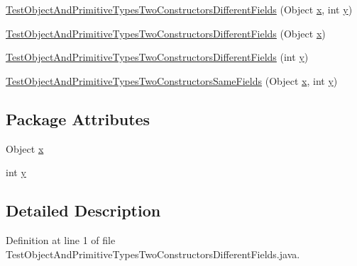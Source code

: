 \begin{DoxyCompactItemize}
\item 
\hyperlink{classTestObjectAndPrimitiveTypesTwoConstructorsDifferentFields_a9a6421d326f71132f1d7c49c3707a3df}{TestObjectAndPrimitiveTypesTwoConstructorsDifferentFields} (Object \hyperlink{classTestObjectAndPrimitiveTypesTwoConstructorsDifferentFields_acd6e4372ac5a3f095fe827a7649f4e01}{x}, int \hyperlink{classTestObjectAndPrimitiveTypesTwoConstructorsDifferentFields_a78a43959fdccd99feddcc7042de33188}{y})
\item 
\hyperlink{classTestObjectAndPrimitiveTypesTwoConstructorsDifferentFields_a1700da7274a7df883f35c35f048a87dc}{TestObjectAndPrimitiveTypesTwoConstructorsDifferentFields} (Object \hyperlink{classTestObjectAndPrimitiveTypesTwoConstructorsDifferentFields_acd6e4372ac5a3f095fe827a7649f4e01}{x})
\item 
\hyperlink{classTestObjectAndPrimitiveTypesTwoConstructorsDifferentFields_ad67d6484799aed0100b04acafd89fbb4}{TestObjectAndPrimitiveTypesTwoConstructorsDifferentFields} (int \hyperlink{classTestObjectAndPrimitiveTypesTwoConstructorsDifferentFields_a78a43959fdccd99feddcc7042de33188}{y})
\item 
\hyperlink{classTestObjectAndPrimitiveTypesTwoConstructorsDifferentFields_a3806c3ff463cc032abd2c9c7848111e2}{TestObjectAndPrimitiveTypesTwoConstructorsSameFields} (Object \hyperlink{classTestObjectAndPrimitiveTypesTwoConstructorsDifferentFields_acd6e4372ac5a3f095fe827a7649f4e01}{x}, int \hyperlink{classTestObjectAndPrimitiveTypesTwoConstructorsDifferentFields_a78a43959fdccd99feddcc7042de33188}{y})
\end{DoxyCompactItemize}
\subsection*{Package Attributes}
\begin{DoxyCompactItemize}
\item 
Object \hyperlink{classTestObjectAndPrimitiveTypesTwoConstructorsDifferentFields_acd6e4372ac5a3f095fe827a7649f4e01}{x}
\item 
int \hyperlink{classTestObjectAndPrimitiveTypesTwoConstructorsDifferentFields_a78a43959fdccd99feddcc7042de33188}{y}
\end{DoxyCompactItemize}


\subsection{Detailed Description}


Definition at line 1 of file TestObjectAndPrimitiveTypesTwoConstructorsDifferentFields.java.



